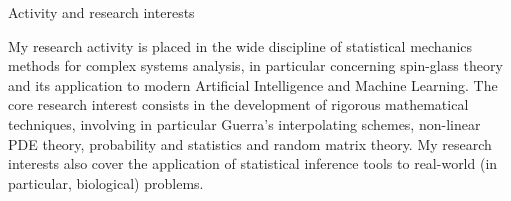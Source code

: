 \begin{rubric}{Activity and research interests}\begin{minipage}{\textwidth}
My research activity is placed in the wide discipline of statistical mechanics methods for complex systems analysis, in particular concerning spin-glass theory and its application to modern Artificial Intelligence and Machine Learning. The core research interest consists in the development of rigorous mathematical techniques, involving in particular Guerra's interpolating schemes, non-linear PDE theory, probability and statistics and random matrix theory. My research interests also cover the application of statistical inference tools to real-world (in particular, biological) problems.
\end{minipage}\end{rubric}